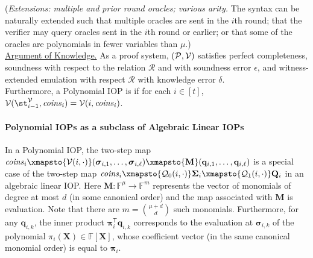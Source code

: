 \begin{definition}
(\emph{Extensions: multiple and prior round oracles; various arity.} The syntax can be naturally extended such that multiple oracles are sent in the $i$th round; that the verifier may query oracles sent in the $i$th round or earlier; or that some of the oracles are polynomials in fewer variables than $\mu$.) \\ 

\noindent \underline{Argument of Knowledge.} As a proof system, $(\mathcal{P}, \mathcal{V})$ satisfies perfect completeness, soundness with respect to the relation $\mathcal{R}$ and with soundness error $\epsilon$, and witness-extended emulation with respect $\mathcal{R}$ with knowledge error $\delta$. \\

Furthermore, a Polynomial IOP is  if for each $i \in [t]$, $\mathcal{V}(\st^\verifier_{i-1}, \mathit{coins}_i) = \mathcal{V}(i, \mathit{coins}_i)$. 
\end{definition}

\paragraph{Polynomial IOPs as a subclass of Algebraic Linear IOPs}

In a Polynomial IOP, the two-step map $\mathit{coins}_i \xmapsto{\verifier(i, \cdot)} (\boldsymbol{\sigma}_{i,1}, \ldots, \boldsymbol{\sigma}_{i,\ell}) \xmapsto{\mathbf{M}} (\mathbf{q}_{i,1}, \ldots, \mathbf{q}_{i,\ell})$ is a special case of the two-step map $\mathit{coins}_i \xmapsto{\qgen_0(i, \cdot)} \boldsymbol{\Sigma}_i \xmapsto{\qgen_1(i, \cdot)} \mathbf{Q}_i$ in an algebraic linear IOP. Here $\mathbf{M} : \mathbb{F}^{\mu} \rightarrow \mathbb{F}^{m}$ represents the vector of monomials of degree at most $d$ (in some canonical order) and the map associated with $\mathbf{M}$ is evaluation. Note that there are $m = \binom{\mu + d }{ d}$ such monomials. Furthermore, for any $\mathbf{q}_{i,k}$, the inner product $\boldsymbol{\pi}_i^\mathsf{T} \mathbf{q}_{i,k}$ corresponds to the evaluation at $\boldsymbol{\sigma}_{i,k}$ of the polynomial $\pi_i(\mathbf{X}) \in \mathbb{F}[\mathbf{X}]$, whose coefficient vector (in the same canonical monomial order) is equal to $\boldsymbol{\pi}_i$.

